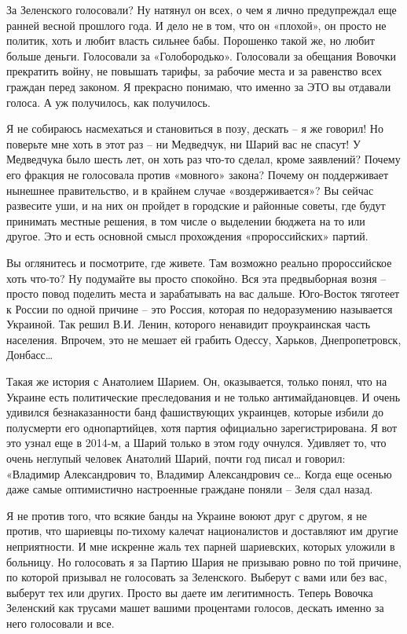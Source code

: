 За Зеленского голосовали? Ну натянул он всех, о чем я лично предупреждал еще
ранней весной прошлого года. И дело не в том, что он «плохой», он просто не
политик, хоть и любит власть сильнее бабы. Порошенко такой же, но любит больше
деньги. Голосовали за «Голобородько». Голосовали за обещания Вовочки прекратить
войну, не повышать тарифы, за рабочие места и за равенство всех граждан перед
законом. Я прекрасно понимаю, что именно за ЭТО вы отдавали голоса. А уж
получилось, как получилось.

Я не собираюсь насмехаться и становиться в позу, дескать – я же говорил! Но
поверьте мне хоть в этот раз – ни Медведчук, ни Шарий вас не спасут! У
Медведчука было шесть лет, он хоть раз что-то сделал, кроме заявлений? Почему
его фракция не голосовала против «мовного» закона? Почему он поддерживает
нынешнее правительство, и в крайнем случае «воздерживается»? Вы сейчас
развесите уши, и на них он пройдет в городские и районные советы, где будут
принимать местные решения, в том числе о выделении бюджета на то или другое.
Это и есть основной смысл прохождения «пророссийских» партий.

Вы оглянитесь и посмотрите, где живете. Там возможно реально пророссийское хоть
что-то? Ну подумайте вы просто спокойно. Вся эта предвыборная возня – просто
повод поделить места и зарабатывать на вас дальше. Юго-Восток тяготеет к России
по одной причине – это Россия, которая по недоразумению называется Украиной.
Так решил В.И. Ленин, которого ненавидит проукраинская часть населения.
Впрочем, это не мешает ей грабить Одессу, Харьков, Днепропетровск, Донбасс…

Такая же история с Анатолием Шарием. Он, оказывается, только понял, что на
Украине есть политические преследования и не только антимайдановцев. И очень
удивился безнаказанности банд фашиствующих украинцев, которые избили до
полусмерти его однопартийцев, хотя партия официально зарегистрирована. Я вот
это узнал еще в 2014-м, а Шарий только в этом году очнулся. Удивляет то, что
очень неглупый человек Анатолий Шарий, почти год писал и говорил: «Владимир
Александрович то, Владимир Александрович се… Когда еще осенью даже самые
оптимистично настроенные граждане поняли – Зеля сдал назад.

Я не против того, что всякие банды на Украине воюют друг с другом, я не против,
что шариевцы по-тихому калечат националистов и доставляют им другие
неприятности. И мне искренне жаль тех парней шариевских, которых уложили в
больницу. Но голосовать я за Партию Шария не призываю ровно по той причине, по
которой призывал не голосовать за Зеленского. Выберут с вами или без вас,
выберут тех или других. Просто вы даете им легитимность. Теперь Вовочка
Зеленский как трусами машет вашими процентами голосов, дескать именно за него
голосовали и все.

